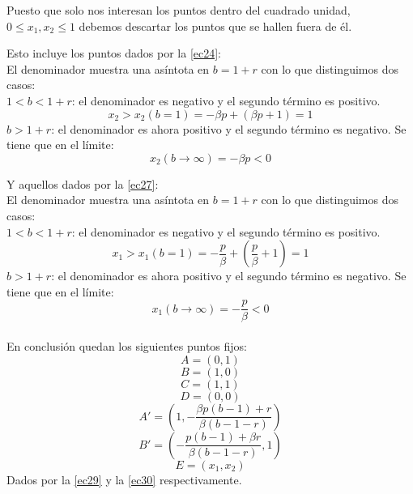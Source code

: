 \documentclass[11pt]{article}
\begin{document}
\newpage

\noindent Puesto que solo nos interesan los puntos dentro del cuadrado unidad, $0\leq x_1,x_2\leq 1$ debemos descartar los puntos que se hallen fuera de él.

Esto incluye los puntos dados por la \autoref{ec24}:\\
El denominador muestra una asíntota en $b=1+r$ con lo que distinguimos dos casos:\\
$1<b<1+r$: el denominador es negativo y el segundo término es positivo.
\begin{equation*}
x_2>x_2(b=1)=-\beta p+(\beta p+1)=1
\end{equation*}
$b>1+r$: el denominador es ahora positivo y el segundo término es negativo. Se tiene que en el límite:
\begin{equation*}
x_2(b\rightarrow\infty)=-\beta p<0
\end{equation*}


Y aquellos dados por la \autoref{ec27}:\\
El denominador muestra una asíntota en $b=1+r$ con lo que distinguimos dos casos:\\
$1<b<1+r$: el denominador es negativo y el segundo término es positivo.
\begin{equation*}
x_1>x_1(b=1)=-\dfrac{p}{\beta}+\left(\dfrac{p}{\beta}+1\right)=1
\end{equation*}
$b>1+r$: el denominador es ahora positivo y el segundo término es negativo. Se tiene que en el límite:
\begin{equation*}
x_1(b\rightarrow\infty)=-\dfrac{p}{\beta}<0
\end{equation*}\\

En conclusión quedan los siguientes puntos fijos:
\begin{equation*}
A=(0,1)
\end{equation*}
\begin{equation*}
B=(1,0)
\end{equation*}
\begin{equation*}
C=(1,1)
\end{equation*}
\begin{equation*}
D=(0,0)
\end{equation*}
\begin{equation*}
A'=\left(1,-\dfrac{\beta p(b-1)+r}{\beta(b-1-r)}\right)
\end{equation*}
\begin{equation*}
B'=\left(-\dfrac{p(b-1)+\beta r}{\beta(b-1-r)},1\right)
\end{equation*}
\begin{equation*}
E=\left(x_1,x_2\right)
\end{equation*}
\vspace{-1.2cm}
Dados por la \autoref{ec29} y la \autoref{ec30} respectivamente.
\end{document}
